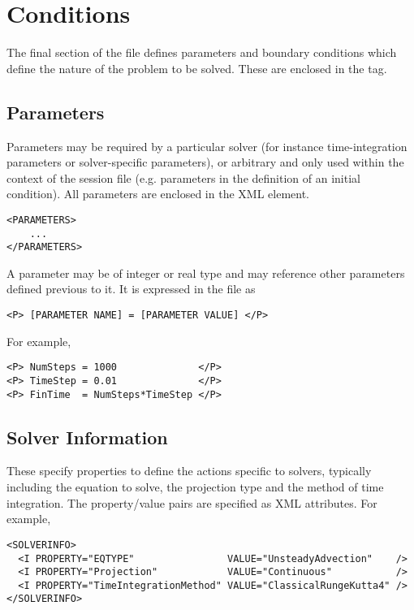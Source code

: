 \section{Conditions}
The final section of the file defines parameters and boundary conditions which
define the nature of the problem to be solved. These are enclosed in the
 tag.

\subsection{Parameters}

Parameters may be required by a particular solver (for instance time-integration
parameters or solver-specific parameters), or arbitrary and only used within the
context of the session file (e.g. parameters in the definition of an initial
condition). All parameters are enclosed in the  XML element.

\begin{lstlisting}[style=XMLStyle] 
<PARAMETERS>
    ...
</PARAMETERS>
\end{lstlisting}

A parameter may be of integer or real type and may reference other parameters
defined previous to it. It is expressed in the file as

\begin{lstlisting}[style=XMLStyle]
<P> [PARAMETER NAME] = [PARAMETER VALUE] </P>
\end{lstlisting}

For example,

\begin{lstlisting}[style=XMLStyle]
<P> NumSteps = 1000              </P>
<P> TimeStep = 0.01              </P>
<P> FinTime  = NumSteps*TimeStep </P>
\end{lstlisting}

\subsection{Solver Information}

These specify properties to define the actions specific to solvers, typically
including the equation to solve, the projection type and the method of time
integration. The property/value pairs are specified as XML attributes. For
example, 
\begin{lstlisting}[style=XMLStyle] 
<SOLVERINFO>
  <I PROPERTY="EQTYPE"                VALUE="UnsteadyAdvection"    /> 
  <I PROPERTY="Projection"            VALUE="Continuous"           /> 
  <I PROPERTY="TimeIntegrationMethod" VALUE="ClassicalRungeKutta4" />
</SOLVERINFO>
\end{lstlisting}

